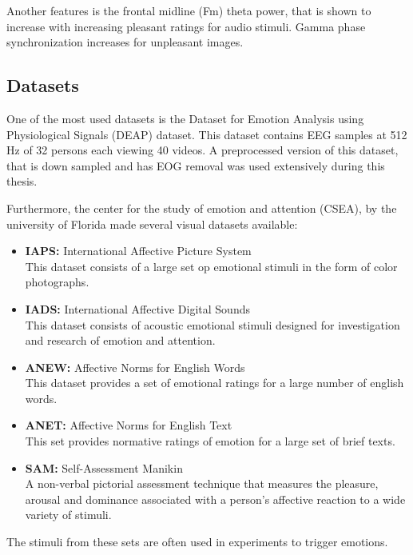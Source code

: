 \npar

Another features is the frontal midline (Fm) theta power, that is shown to increase with increasing pleasant ratings for audio stimuli\cite{MusicPaper}. Gamma phase synchronization increases for unpleasant images.

\subsection{Datasets}
One of the most used datasets is the Dataset for Emotion Analysis using Physiological Signals (DEAP) dataset\cite{DEAP}. This dataset contains EEG samples at 512 Hz of 32 persons each viewing 40 videos. A preprocessed version of this dataset, that is down sampled and has EOG removal was used extensively during this thesis.

\npar

Furthermore, the center for the study of emotion and attention (CSEA), by the university of Florida made several visual datasets available:
\begin{itemize}
\item \textbf{IAPS:} International Affective Picture System\\
This dataset consists of a large set op emotional stimuli in the form of color photographs.
\item \textbf{IADS:} International Affective Digital Sounds \\
This dataset consists of acoustic emotional stimuli designed for investigation and research of emotion and attention.
\item \textbf{ANEW:} Affective Norms for English Words\\
This dataset provides a set of emotional ratings for a large number of english words.
\item \textbf{ANET:} Affective Norms for English Text\\
This set provides normative ratings of emotion for a large set of brief texts.
\item \textbf{SAM:} Self-Assessment Manikin\\
A non-verbal pictorial assessment technique that measures the pleasure, arousal and dominance associated with a person's affective reaction to a wide variety of stimuli.
\end{itemize}
The stimuli from these sets are often used in experiments to trigger emotions\cite{ExtendedPaper}\cite{EmotionSite}\cite{RealTimeEEGEmotion}\cite{EEGDatasets}.

